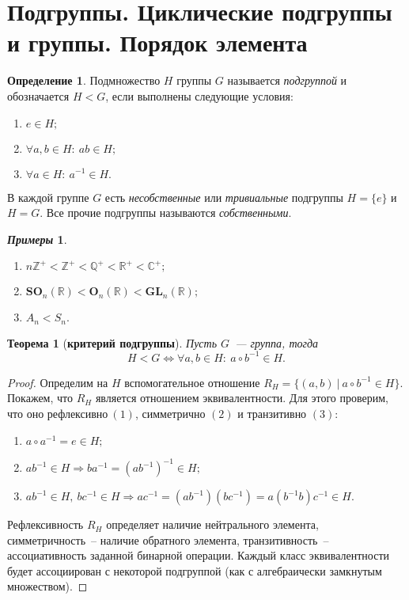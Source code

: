 \documentclass[a4paper, 14pt]{extarticle}
\newcommand{\n}{\par}
\newcommand{\integers}{\mathbb{Z}}
\newcommand{\rationals}{\mathbb{Q}}
\newcommand{\real}{\mathbb{R}}
\newcommand{\complex}{\mathbb{C}}
\newcommand{\GL}{\mathbf{GL}}
\newcommand{\Orth}{\mathbf{O}}
\newcommand{\SOrth}{\mathbf{SO}}
\theoremstyle{definition}
\newtheorem*{exmpls}{\textit{Примеры}}
\newtheorem{definition}{Определение}
\theoremstyle{plain}
\newtheorem*{theorem*}{Теорема}
\numberwithin{theorem}{section}
\numberwithin{definition}{section}
\numberwithin{statement}{section}
\numberwithin{lemma}{section}
\numberwithin{consequence}{section}
\begin{document}
	\section{Подгруппы. Циклические подгруппы и группы. Порядок элемента}
	\begin{definition}	
		Подмножество $H$ группы $G$ называется \textit{подгруппой} и обозначается $H < G$, если выполнены следующие условия:
		\begin{enumerate}
			\setlength\itemsep{0.1em}
			\item $e \in H;$
			\item $\forall a,b \in H{:} \ ab \in H;$
			\item $\forall a \in H{:} \ a^{-1} \in H.$
		\end{enumerate}
	\end{definition}
	В каждой группе $G$ есть \textit{несобственные} или \textit{тривиальные} подгруппы $H = \{e\}$ и $H = G$. Все прочие подгруппы называются \textit{собственными}.
	\begin{exmpls}
		\
		\begin{enumerate}
			\setlength\itemsep{0.1em}
			\item ${n\integers^ + < \integers ^ + < \rationals ^ + < \real ^ + < \complex ^ +;}$
			\item ${\SOrth_n(\real) < \Orth_n(\real) < \GL_n(\real);}$
			\item ${A_n < S_n.}$
		\end{enumerate}
	\end{exmpls}
	\begin{theorem*}[\textbf{критерий подгруппы}]
		Пусть $G$~--- группа, тогда
		\begin{equation*}
			H < G \Longleftrightarrow \forall a,b \in H{:} \ a \circ b^{-1} \in H.
		\end{equation*}
	\end{theorem*}
	\begin{proof}
		Определим на $H$ вспомогательное отношение ${R_H = \{(a,b)\ | \ a \circ b^{-1} \in H\}}.$ Покажем, что $R_H$ является отношением эквивалентности. Для этого проверим, что оно ${\text{рефлексивно} \ (1)}$, симметрично $(2)$ и транзитивно $(3)$:
		\begin{enumerate}
			\setlength\itemsep{0.1em}
			\item $a \circ a^{-1} = e \in H;$
			\item $ab^{-1} \in H \Longrightarrow b a^{-1} = (ab^{-1})^{-1} \in H;$
			\item $ab^{-1} \in H, \ bc^{-1} \in H \Longrightarrow ac^{-1} = (ab^{-1})(bc^{-1}) = a(b^{-1}b)c^{-1} \in H.$
		\end{enumerate} \n
		
		Рефлексивность $R_H$ определяет наличие нейтрального элемента, симметричность~-- наличие обратного элемента, транзитивность~-- ассоциативность заданной бинарной операции. Каждый класс эквивалентности будет ассоциирован с некоторой подгруппой (как с алгебраически замкнутым множеством). 
	\end{proof}
\end{document}
